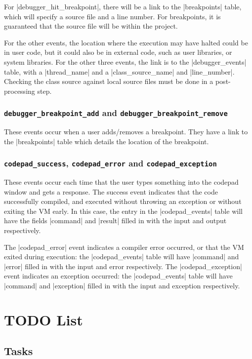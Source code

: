 \documentclass{book}
\begin{document}
For |debugger_hit_breakpoint|, there will be a link to the |breakpoints|
table, which will specify a source file and a line number.  For breakpoints,
it is guaranteed that the source file will be within the project.

For the other events, the location where the execution may have halted could
be in user code, but it could also be in external code, such as user
libraries, or system libraries.  For the other three events, the link is to
the |debugger_events| table, with a |thread_name| and a |class_source_name|
and |line_number|.  Checking the class source against local source files must
be done in a post-processing step.

\subsection{\lstinline|debugger_breakpoint_add| and
  \lstinline|debugger_breakpoint_remove|}

These events occur when a user adds/removes a breakpoint.  They have a link to
the |breakpoints| table which details the location of the breakpoint.

\subsection{\lstinline|codepad_success|, \lstinline|codepad_error| and
  \lstinline|codepad_exception|}

These events occur each time that the user types something into the codepad
window and gets a response.  The success event indicates that the code
successfully compiled, and executed without throwing an exception or without
exiting the VM early.  In this case, the entry in the |codepad_events| table
will have the fields |command| and |result| filled in with the input and
output respectively.

The |codepad_error| event indicates a compiler error occurred, or that the VM
exited during execution: the
|codepad_events| table will have |command| and |error| filled in with the
input and error respectively.  The |codepad_exception| event indicates an exception occurred: the
|codepad_events| table will have |command| and |exception| filled in with the
input and exception respectively.

\chapter{TODO List}

\section{Tasks}
\end{document}
